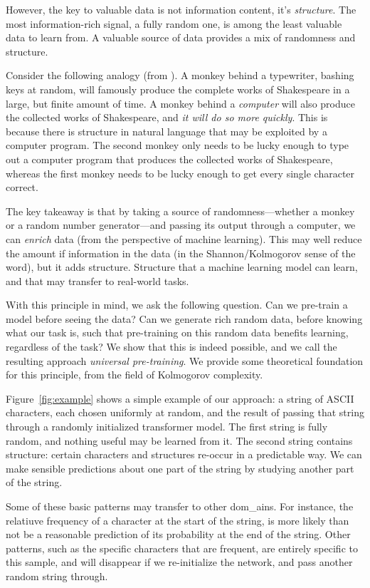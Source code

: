 \documentclass{article} %
\begin{document}
However, the key to valuable data is not information content, it's \emph{structure}. The most information-rich signal, a fully random one, is among the least valuable data to learn from. A valuable source of data provides a mix of randomness and structure.

Consider the following analogy (from \cite{}). A monkey behind a typewriter, bashing keys at random, will famously produce the complete works of Shakespeare in a large, but finite amount of time. A monkey behind a \emph{computer} will also produce the collected works of Shakespeare, and \emph{it will do so more quickly}. This is because there is structure in natural language that may be exploited by a computer program. The second monkey only needs to be lucky enough to type out a computer program that produces the collected works of Shakespeare, whereas the first monkey needs to be lucky enough to get every single character correct.

The key takeaway is that by taking a source of randomness---whether a monkey or a random number generator---and passing its output through a computer, we can \emph{enrich} data (from the perspective of machine learning). This may well reduce the amount if information in the data (in the Shannon/Kolmogorov sense of the word), but it adds structure. Structure that a machine learning model can learn, and that may transfer to real-world tasks.

With this principle in mind, we ask the following question. Can we pre-train a model before seeing the data? Can we generate rich random data, before knowing what our task is, such that pre-training on this random data benefits learning, regardless of the task? We show that this is indeed possible, and we call the resulting approach \emph{universal pre-training}. We provide some theoretical foundation for this principle, from the field of Kolmogorov complexity.

Figure~\ref{fig:example} shows a simple example of our approach: a string of ASCII characters, each chosen uniformly at random, and the result of passing that string through a randomly initialized transformer model. The first string is fully random, and nothing useful may be learned from it. The second string contains structure: certain characters and structures re-occur in a predictable way. We can make sensible predictions about one part of the string by studying another part of the string. 

Some of these basic patterns may transfer to other dom_ains. For instance, the relatiuve frequency of a character at the start of the string, is more likely than not be a reasonable prediction of its probability at the end of the string. Other patterns, such as the specific characters that are frequent, are entirely specific to this sample, and will disappear if we re-initialize the network, and pass another random string through. 
\end{document}
